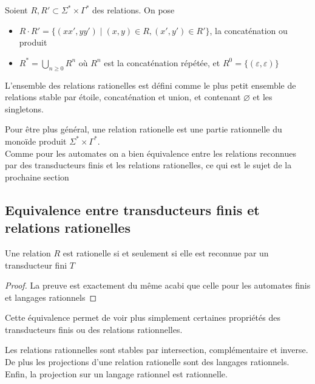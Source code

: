 \documentclass{scrartcl}
\begin{document}
\begin{flushleft}
\begin{define}
    Soient $R, R' \subset \Sigma^* \times \Gamma^*$ des relations. On pose
    \begin{itemize}
        \item $R \cdot R' = \{ (xx', yy') \mid (x, y) \in R, (x', y') \in R' \}$, la concaténation ou produit
        \item $\displaystyle R^* = \bigcup_{n \geq 0} R^n$ où $R^n$ est la concaténation répétée, et $R^0 =
        \{ (\varepsilon, \varepsilon) \}$
    \end{itemize}
\end{define}

\begin{define}
    L'ensemble des relations rationelles est défini comme le plus petit ensemble de relations stable par étoile,
    concaténation et union, et contenant $\varnothing$ et les singletons.
\end{define}

Pour être plus général, une relation rationelle est une partie rationnelle du monoïde produit
$\Sigma^* \times \Gamma^*$.\\
Comme pour les automates on a bien équivalence entre les relations reconnues par des transducteurs finis
et les relations rationelles, ce qui est le sujet de la prochaine section

\subsection{Equivalence entre transducteurs finis et relations rationelles}

\begin{theorem}
    Une relation $R$ est rationelle si et seulement si elle est reconnue par un transducteur fini $T$
\end{theorem}

\begin{proof}
    La preuve est exactement du même acabi que celle pour les automates finis et langages rationnels
\end{proof}

Cette équivalence permet de voir plus simplement certaines propriétés des transducteurs finis ou des relations
rationnelles.
\begin{prop}
    Les relations rationnelles sont stables par intersection, complémentaire et inverse. De plus les projections d'une relation
    rationelle sont des langages rationnels. Enfin, la projection sur un langage rationnel est rationnelle.
\end{prop}


\end{flushleft}
\end{document}
